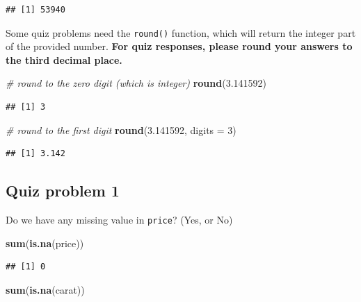 \documentclass[]{book}
\newenvironment{Shaded}{\begin{snugshade}}{\end{snugshade}}
\newcommand{\CommentTok}[1]{\textcolor[rgb]{0.56,0.35,0.01}{\textit{#1}}}
\newcommand{\DataTypeTok}[1]{\textcolor[rgb]{0.13,0.29,0.53}{#1}}
\newcommand{\DecValTok}[1]{\textcolor[rgb]{0.00,0.00,0.81}{#1}}
\newcommand{\FloatTok}[1]{\textcolor[rgb]{0.00,0.00,0.81}{#1}}
\newcommand{\KeywordTok}[1]{\textcolor[rgb]{0.13,0.29,0.53}{\textbf{#1}}}
\newcommand{\NormalTok}[1]{#1}
\begin{document}
\begin{verbatim}
## [1] 53940
\end{verbatim}

Some quiz problems need the \texttt{round()} function, which will return the integer part of the provided number. \textbf{For quiz responses, please round your answers to the third decimal place.}

\begin{Shaded}
\begin{Highlighting}[]
\CommentTok{# round to the zero digit (which is integer)}
\KeywordTok{round}\NormalTok{(}\FloatTok{3.141592}\NormalTok{)}
\end{Highlighting}
\end{Shaded}

\begin{verbatim}
## [1] 3
\end{verbatim}

\begin{Shaded}
\begin{Highlighting}[]
\CommentTok{# round to the first digit}
\KeywordTok{round}\NormalTok{(}\FloatTok{3.141592}\NormalTok{, }\DataTypeTok{digits =} \DecValTok{3}\NormalTok{)}
\end{Highlighting}
\end{Shaded}

\begin{verbatim}
## [1] 3.142
\end{verbatim}

\hypertarget{quiz-problem-1}{%
\subsection{Quiz problem 1}\label{quiz-problem-1}}

Do we have any missing value in \texttt{price}? (Yes, or No)

\begin{Shaded}
\begin{Highlighting}[]
\KeywordTok{sum}\NormalTok{(}\KeywordTok{is.na}\NormalTok{(price))}
\end{Highlighting}
\end{Shaded}

\begin{verbatim}
## [1] 0
\end{verbatim}

\begin{Shaded}
\begin{Highlighting}[]
\KeywordTok{sum}\NormalTok{(}\KeywordTok{is.na}\NormalTok{(carat))}
\end{Highlighting}
\end{Shaded}
\end{document}
